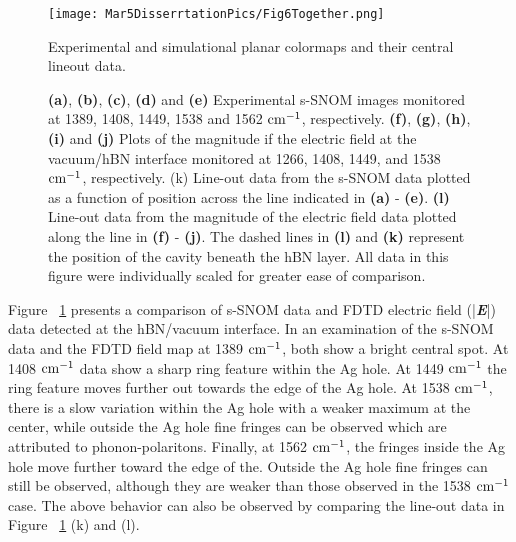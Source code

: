 \documentclass[12pt]{report}
\begin{document}
      \begin{figure}[!htb]
        \centering\texttt{[image: Mar5DisserrtationPics/Fig6Together.png]}
        \caption{Experimental and simulational planar colormaps and their central lineout data.}
        \caption*{\textbf{(a)}, \textbf{(b)}, \textbf{(c)}, \textbf{(d)} and \textbf{(e)} Experimental s-SNOM images monitored at 1389, 1408, 1449, 1538 and 1562 $\rm cm^{-1}$, respectively. \textbf{(f)}, \textbf{(g)}, \textbf{(h)}, \textbf{(i)} and \textbf{(j)} Plots of the magnitude if the electric field at the vacuum/hBN interface monitored at 1266, 1408, 1449, and 1538 $\rm cm^{-1}$, respectively. (k) Line-out data from the s-SNOM data plotted as a function of position across the line indicated in \textbf{(a)} - \textbf{(e)}. \textbf{(l)}  Line-out data from the magnitude of the electric field data plotted along the line in \textbf{(f)} - \textbf{(j)}. The dashed lines in \textbf{(l)} and \textbf{(k)} represent the position of the cavity beneath the hBN layer. All data in this figure were individually scaled for greater ease of comparison.}
        \label{fig:6}
      \end{figure}

      Figure ~\ref{fig:6} presents a comparison of s-SNOM data and FDTD electric field (|\textbf{\textit{E}}|) data detected at the hBN/vacuum interface. In an examination of the s-SNOM data and the FDTD field map at 1389 $\rm cm^{-1}$, both show a bright central spot. At 1408 $\rm cm^{-1}$ data show a sharp ring feature within the Ag hole. At 1449 $\rm cm^{-1}$ the ring feature moves further out towards the edge of the Ag hole. At 1538 $\rm cm^{-1}$, there is a slow variation within the Ag hole with a weaker maximum at the center, while outside the Ag hole fine fringes can be observed which are attributed to phonon-polaritons. Finally, at 1562 $\rm cm^{-1}$, the fringes inside the Ag hole move further toward the edge of the. Outside the Ag hole fine fringes can still be observed, although they are weaker than those observed in the 1538 $\rm cm^{-1}$ case. The above behavior can also be observed by comparing the line-out data in Figure ~\ref{fig:6} (k) and (l).
\end{document}
